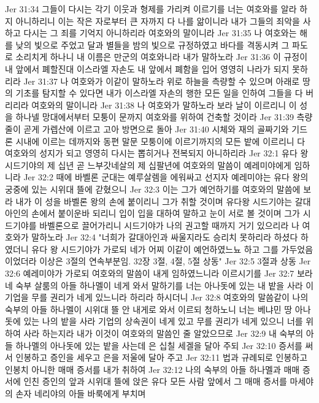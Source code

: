 Jer 31:34  그들이 다시는 각기 이웃과 형제를 가리켜 이르기를 너는 여호와를 알라 하지 아니하리니 이는 작은 자로부터 큰 자까지 다 나를 앎이니라 내가 그들의 죄악을 사하고 다시는 그 죄를 기억지 아니하리라 여호와의 말이니라
Jer 31:35  나 여호와는 해를 낮의 빛으로 주었고 달과 별들을 밤의 빛으로 규정하였고 바다를 격동시켜 그 파도로 소리치게 하나니 내 이름은 만군의 여호와니라 내가 말하노라
Jer 31:36  이 규정이 내 앞에서 폐할진대 이스라엘 자손도 내 앞에서 폐함을 입어 영영히 나라가 되지 못하리라
Jer 31:37  나 여호와가 이같이 말하노라 위로 하늘을 측량할 수 있으며 아래로 땅의 기초를 탐지할 수 있다면 내가 이스라엘 자손의 행한 모든 일을 인하여 그들을 다 버리리라 여호와의 말이니라
Jer 31:38  나 여호와가 말하노라 보라 날이 이르리니 이 성을 하나넬 망대에서부터 모퉁이 문까지 여호와를 위하여 건축할 것이라
Jer 31:39  측량줄이 곧게 가렙산에 이르고 고아 방면으로 돌아
Jer 31:40  시체와 재의 골짜기와 기드론 시내에 이르는 데까지와 동편 말문 모퉁이에 이르기까지의 모든 밭에 이르리니 다 여호와의 성지가 되고 영영히 다시는 뽑히거나 전복되지 아니하리라
Jer 32:1  유다 왕 시드기야의 제 십년 곧 느부갓네살의 제 십팔년에 여호와의 말씀이 예레미야에게 임하니라
Jer 32:2  때에 바벨론 군대는 예루살렘을 에워싸고 선지자 예레미야는 유다 왕의 궁중에 있는 시위대 뜰에 갇혔으니
Jer 32:3  이는 그가 예언하기를 여호와의 말씀에 보라 내가 이 성을 바벨론 왕의 손에 붙이리니 그가 취할 것이며 유다왕 시드기야는 갈대아인의 손에서 붙이운바 되리니 입이 입을 대하여 말하고 눈이 서로 볼 것이며 그가 시드기야를 바벨론으로 끌어가리니 시드기야가 나의 권고할 때까지 거기 있으리라 나 여호와가 말하노라
Jer 32:4  "너희가 갈대아인과 싸울지라도 승리치 못하리라 하셨다 하였더니 유다 왕 시드기야가 가로되 네가 어찌 이같이 예언하였느뇨 하고 그를 가두었음이었더라 이상은 3절의 연속부분임. 32장 3절, 4절, 5절 상동"
Jer 32:5  3절과 상동
Jer 32:6  예레미야가 가로되 여호와의 말씀이 내게 임하였느니라 이르시기를
Jer 32:7  보라 네 숙부 살룸의 아들 하나멜이 네게 와서 말하기를 너는 아나돗에 있는 내 밭을 사라 이 기업을 무를 권리가 네게 있느니라 하리라 하시더니
Jer 32:8  여호와의 말씀같이 나의 숙부의 아들 하나멜이 시위대 뜰 안 내게로 와서 이르되 청하노니 너는 베냐민 땅 아나돗에 있는 나의 밭을 사라 기업의 상속권이 네게 있고 무를 권리가 네게 있으니 너를 위하여 사라 하는지라 내가 이것이 여호와의 말씀인 줄 알았으므로
Jer 32:9  내 숙부의 아들 하나멜의 아나돗에 있는 밭을 사는데 은 십칠 세겔을 달아 주되
Jer 32:10  증서를 써서 인봉하고 증인을 세우고 은을 저울에 달아 주고
Jer 32:11  법과 규례되로 인봉하고 인봉치 아니한 매매 증서를 내가 취하여
Jer 32:12  나의 숙부의 아들 하나멜과 매매 증서에 인친 증인의 앞과 시위대 뜰에 앉은 유다 모든 사람 앞에서 그 매매 증서를 마세야의 손자 네리야의 아들 바룩에게 부치며
